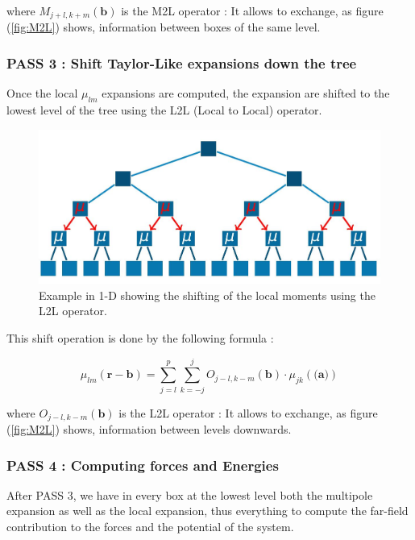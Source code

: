 \documentclass[12pt,twoside,a4paper]{report}
\begin{document}
   	where $M_{j+l,k+m}(\textbf{b})$ is the M2L operator : It allows to exchange, as figure (\ref{fig:M2L}) shows, information between boxes of the same level.

\subsubsection{PASS 3 : Shift Taylor-Like expansions down the tree}

Once the local $\mu_{lm}$ expansions are computed, the expansion are shifted to the lowest level of the tree using the L2L (Local to Local) operator.

	\begin{figure}[H]
	\label{fig:L2L}
   \includegraphics[scale=0.4]{L2L_1}
    \centering 
    \caption{Example in 1-D showing the shifting of the local moments using the L2L operator. }
    
   \end{figure}
    
 	This shift operation is done by the following formula :
 	
 	  \begin{equation}
	  \mu_{lm}(\textbf{r} - \textbf{b}) = \sum\limits_{j = l}^{p} \sum\limits_{k=-j}^{j}
	  O_{j-l,k-m}(\textbf{b}) \cdot \mu_{jk}(\textbf{(a)})
	  \end{equation}
 
 		where $O_{j-l,k-m}(\textbf{b})$ is the L2L operator : It allows to exchange, as figure (\ref{fig:M2L}) shows, information between levels downwards.
 		
 \subsubsection{PASS 4 : Computing forces and Energies}
 
 
 After PASS 3, we have in every box at the lowest level both the multipole expansion as well as the local expansion, thus everything to compute the far-field contribution to the forces and the potential of the system. 
 
\end{document}
